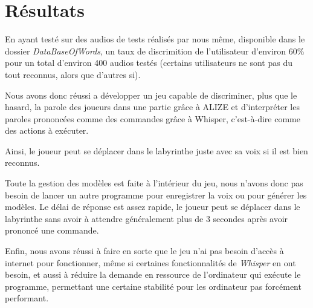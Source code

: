 \section{Résultats}
\label{sec:resultats}

En ayant testé sur des audios de tests réalisés par nous même, disponible dans le dossier \textit{DataBaseOfWords}, un taux de discrimition de l'utilisateur d'environ 60\% pour un total d'environ 400 audios testés (certains utilisateurs ne sont pas du tout reconnus, alors que d'autres si).

Nous avons donc réussi a développer un jeu capable de discriminer, plus que le hasard, la parole des joueurs dans une partie grâce à ALIZE et d'interpréter les paroles prononcées comme des commandes grâce à Whisper, c'est-à-dire comme des
actions à exécuter. 

Ainsi, le joueur peut se déplacer dans le labyrinthe juste avec sa voix si il est bien reconnus. 

Toute la gestion des modèles est faite à l'intérieur du jeu, nous n'avons donc pas besoin de lancer un autre programme pour enregistrer la voix ou pour générer les modèles. 
Le délai de réponse est assez rapide, le joueur peut se déplacer dans le labyrinthe sans avoir à attendre généralement plus de 3 secondes après avoir prononcé une commande. 

Enfin, nous avons réussi à faire en sorte que le jeu n'ai pas besoin d'accès à internet pour fonctionner, même si certaines fonctionnalités de \textit{Whisper} en ont besoin,
et aussi à réduire la demande en ressource de l'ordinateur qui exécute le programme, permettant une certaine stabilité pour les ordinateur pas forcément performant.
